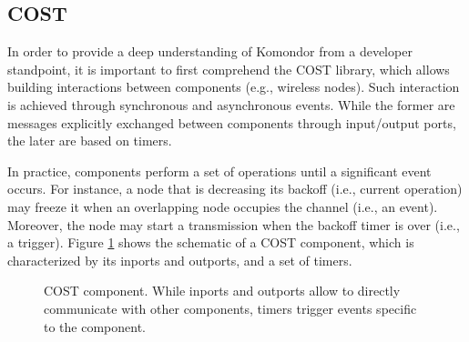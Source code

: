 \documentclass[a4paper]{article}
\begin{document}
\subsection{COST}
\label{section:cost}

In order to provide a deep understanding of Komondor from a developer standpoint, it is important to first comprehend the COST library, which allows building interactions between components (e.g., wireless nodes). Such interaction is achieved through synchronous and asynchronous events. While the former are messages explicitly exchanged between components through input/output ports, the later are based on timers. 

In practice, components perform a set of operations until a significant event occurs. For instance, a node that is decreasing its backoff (i.e., current operation) may freeze it when an overlapping node occupies the channel (i.e., an event). Moreover, the node may start a transmission when the backoff timer is over (i.e., a trigger). Figure \ref{fig:cost} shows the schematic of a COST component, which is characterized by its inports and outports, and a set of timers. 
\begin{figure}[h!]
	\centering
	\caption{COST component. While inports and outports allow to directly communicate with other components, timers trigger events specific to the component.}
	\label{fig:cost}
\end{figure}	

\end{document}
